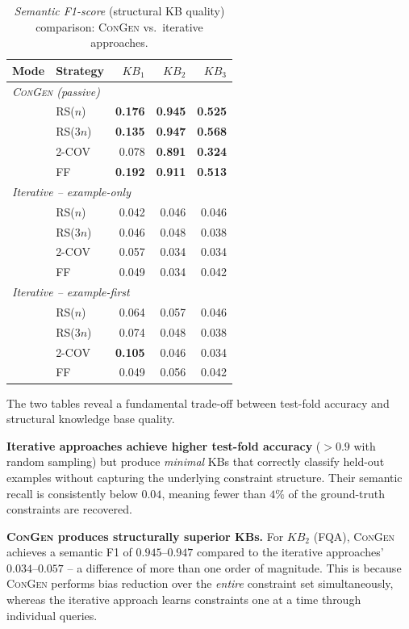 \begin{table}[htbp]
\centering
\caption{\textit{Semantic F1-score} (structural KB quality) comparison: \textsc{ConGen} vs.\ iterative approaches.}
\label{tab:iterative_semantic}
\begin{tabular}{llrrr}
\toprule
Mode & Strategy & $KB_1$ & $KB_2$ & $KB_3$ \\
\midrule
\multicolumn{5}{l}{\textit{\textsc{ConGen} (passive)}} \\
 & RS($n$)  & \textbf{0.176} & \textbf{0.945} & \textbf{0.525} \\
 & RS($3n$) & \textbf{0.135} & \textbf{0.947} & \textbf{0.568} \\
 & 2-COV    & 0.078 & \textbf{0.891} & \textbf{0.324} \\
 & FF       & \textbf{0.192} & \textbf{0.911} & \textbf{0.513} \\
\midrule
\multicolumn{5}{l}{\textit{Iterative -- example-only}} \\
 & RS($n$)  & 0.042 & 0.046 & 0.046 \\
 & RS($3n$) & 0.046 & 0.048 & 0.038 \\
 & 2-COV    & 0.057 & 0.034 & 0.034 \\
 & FF       & 0.049 & 0.034 & 0.042 \\
\midrule
\multicolumn{5}{l}{\textit{Iterative -- example-first}} \\
 & RS($n$)  & 0.064 & 0.057 & 0.046 \\
 & RS($3n$) & 0.074 & 0.048 & 0.038 \\
 & 2-COV    & \textbf{0.105} & 0.046 & 0.034 \\
 & FF       & 0.049 & 0.056 & 0.042 \\
\bottomrule
\end{tabular}
\end{table}

The two tables reveal a fundamental trade-off between test-fold accuracy and structural knowledge base quality.

\textbf{Iterative approaches achieve higher test-fold accuracy} ($>0.9$ with random sampling) but produce \textit{minimal} KBs that correctly classify held-out examples without capturing the underlying constraint structure. Their semantic recall is consistently below $0.04$, meaning fewer than $4\%$ of the ground-truth constraints are recovered.

\textbf{\textsc{ConGen} produces structurally superior KBs.} For $KB_2$ (FQA), \textsc{ConGen} achieves a semantic F1 of $0.945$--$0.947$ compared to the iterative approaches' $0.034$--$0.057$ -- a difference of more than one order of magnitude. This is because \textsc{ConGen} performs bias reduction over the \textit{entire} constraint set simultaneously, whereas the iterative approach learns constraints one at a time through individual queries.

